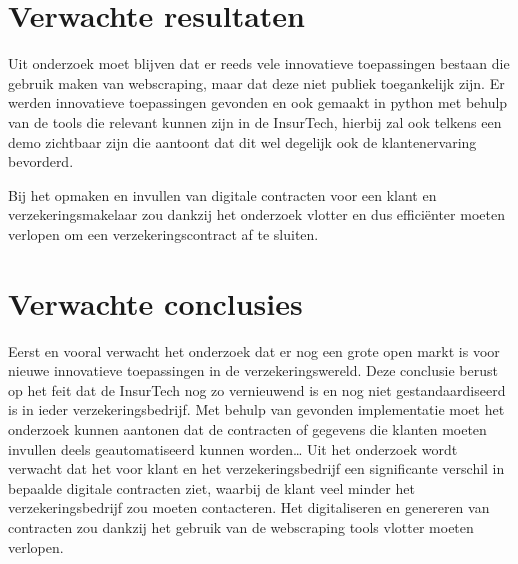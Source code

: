 \section{Verwachte resultaten}
\label{sec:verwachte_resultaten}

Uit onderzoek moet blijven dat er reeds vele innovatieve toepassingen bestaan die gebruik maken van webscraping,
maar dat deze niet publiek toegankelijk zijn.
Er werden innovatieve toepassingen gevonden en ook gemaakt in python met behulp van de tools die relevant kunnen zijn in de InsurTech,
hierbij zal ook telkens een demo zichtbaar zijn die aantoont dat dit wel degelijk ook de klantenervaring bevorderd.

Bij het opmaken en invullen van digitale contracten voor een klant en verzekeringsmakelaar zou dankzij het onderzoek
vlotter en dus efficiënter moeten verlopen om een verzekeringscontract af te sluiten.


\section{Verwachte conclusies}
\label{sec:verwachte_conclusies}

Eerst en vooral verwacht het onderzoek dat er nog een grote open markt is voor nieuwe innovatieve toepassingen in de verzekeringswereld.
Deze conclusie berust op het feit dat de InsurTech nog zo vernieuwend is en nog niet gestandaardiseerd is in ieder verzekeringsbedrijf.
Met behulp van gevonden implementatie moet het onderzoek kunnen aantonen dat de contracten of gegevens die klanten moeten invullen deels geautomatiseerd kunnen worden…
Uit het onderzoek wordt verwacht dat het voor klant en het verzekeringsbedrijf een significante verschil in bepaalde digitale contracten ziet, waarbij de klant veel minder het verzekeringsbedrijf zou moeten contacteren. Het digitaliseren en genereren van contracten zou dankzij het gebruik van de webscraping tools vlotter moeten verlopen.


